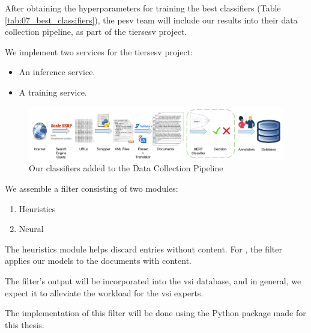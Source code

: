 \label{08_practical_implications}

\label{08_overview}


After obtaining the hyperparameters for training the best classifiers (Table \ref{tab:07_best_classifiers}), the \gls{pesv} team will include our results into their data collection pipeline, as part of the \gls{tiersesv} project.

We implement two services for the \gls{tiersesv} project:
\begin{itemize}
    \item An inference service.
    \item A training service.
\end{itemize}



\label{08_inference_service}


\begin{figure}[h]
    \centering
    \includegraphics[width=\textwidth]{Figures/08/08_vsi_dataset_collection_with_classifier.png}
    \caption{Our classifiers added to the \VSI{} Data Collection Pipeline}
    \label{fig:08_vsi_data_collection_pipeline_with_classifier}
\end{figure}


We assemble a filter consisting of two modules:
\begin{enumerate}
    \item Heuristics 
    \item Neural \textclassification{}
\end{enumerate}

The heuristics module helps discard entries without content. For \textclassification{}, the filter applies our models to the documents with content.

The filter's output will be incorporated into the \gls{vsi} database, and in general, we expect it to alleviate the workload for the \gls{vsi} experts.

The implementation of this filter will be done using the Python package made for this thesis. 

